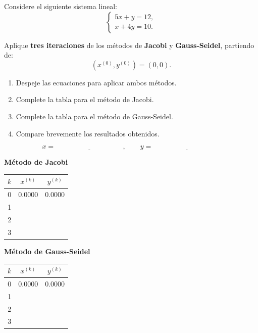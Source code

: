 \documentclass[10pt,respuestas,a4]{aleph-examen}
\begin{document}
\begin{preguntas}


\item
Considere el siguiente sistema lineal: 
\[
\begin{cases}
5x+y=12,\\
x+4y=10.
\end{cases}
\]

Aplique \textbf{tres iteraciones} de los métodos de \textbf{Jacobi} y \textbf{Gauss-Seidel}, partiendo de:
\[
(x^{(0)},y^{(0)})=(0,0).
\]

\begin{enumerate}[label=\alph*)]
    \item Despeje las ecuaciones para aplicar ambos métodos.
    \item Complete la tabla para el método de Jacobi.
    \item Complete la tabla para el método de Gauss-Seidel.
    \item Compare brevemente los resultados obtenidos.
\end{enumerate}

\[
x=\underline{\hspace{4cm}}, 
\qquad 
y=\underline{\hspace{4cm}}
\]

\begin{center}
\textbf{Método de Jacobi}

\renewcommand{\arraystretch}{1.4}
\begin{tabular}{c|c|c}
\toprule
$k$ & $x^{(k)}$ & $y^{(k)}$ \\
\midrule
0 & 0.0000 & 0.0000 \\
1 &  &  \\
2 &  &  \\
3 &  &  \\
\bottomrule
\end{tabular}
\end{center}

\begin{center}
\textbf{Método de Gauss-Seidel}

\renewcommand{\arraystretch}{1.4}
\begin{tabular}{c|c|c}
\toprule
$k$ & $x^{(k)}$ & $y^{(k)}$ \\
\midrule
0 & 0.0000 & 0.0000 \\
1 &  &  \\
2 &  &  \\
3 &  &  \\
\bottomrule
\end{tabular}
\end{center}


\end{preguntas}
\end{document}
